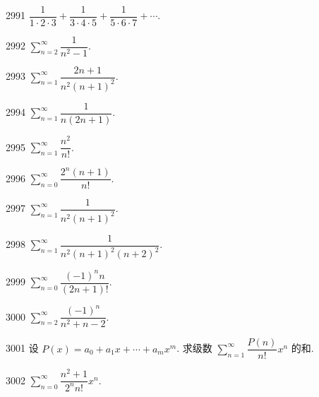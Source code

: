 \begin{prob}[S]{2991}
$\dfrac{1}{1\cdot 2\cdot 3} + \dfrac{1}{3\cdot 4\cdot 5} + \dfrac{1}{5\cdot 6\cdot 7} + \cdots$.
\end{prob}

\begin{prob}[S]{2992}
$\sum\limits_{n=2}^{\infty} \dfrac{1}{n^2 - 1}$.
\end{prob}

\begin{prob}[S]{2993}
$\sum\limits_{n=1}^{\infty} \dfrac{2n+1}{n^2(n+1)^2}$.
\end{prob}

\begin{prob}[S]{2994}
$\sum\limits_{n=1}^{\infty} \dfrac{1}{n(2n+1)}$.
\end{prob}

\begin{prob}[S]{2995}
$\sum\limits_{n=1}^{\infty} \dfrac{n^2}{n!}$.
\end{prob}

\begin{prob}[S]{2996}
$\sum\limits_{n=0}^{\infty} \dfrac{2^n(n+1)}{n!}$.
\end{prob}

\begin{prob}[S]{2997}
$\sum\limits_{n=1}^{\infty} \dfrac{1}{n^2(n+1)^2}$.
\end{prob}

\begin{prob}[S]{2998}
$\sum\limits_{n=1}^{\infty} \dfrac{1}{n^2(n+1)^2(n+2)^2}$.
\end{prob}

\begin{prob}[S]{2999}
$\sum\limits_{n=0}^{\infty} \dfrac{(-1)^n n}{(2n+1)!}$.
\end{prob}

\begin{prob}[S]{3000}
$\sum\limits_{n=2}^{\infty} \dfrac{(-1)^n}{n^2 + n - 2}$.
\end{prob}

\begin{prob}[M]{3001}
设 $P(x) = a_0 + a_1 x + \cdots + a_m x^m$. 求级数 $\sum\limits_{n=1}^{\infty} \dfrac{P(n)}{n!} x^n$ 的和.
\end{prob}


\begin{prob}[S]{3002}
$\sum\limits_{n=0}^{\infty} \dfrac{n^2 + 1}{2^n n!} x^n$.
\end{prob}

